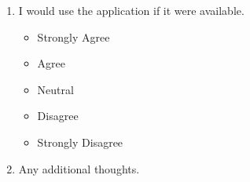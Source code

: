 \begin{enumerate}
	\item I would use the application if it were available.
		\begin{itemize}
			\item Strongly Agree
			\item Agree
			\item Neutral
			\item Disagree
			\item Strongly Disagree
		\end{itemize}
	
	\item Any additional thoughts.
\end{enumerate}